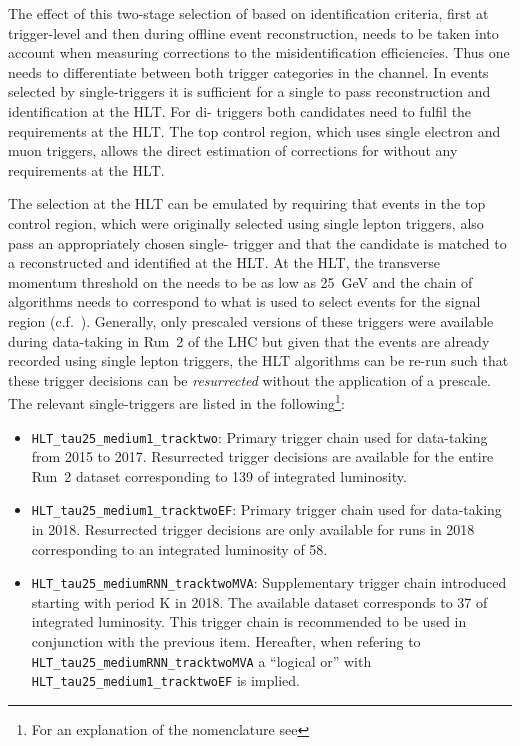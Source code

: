 The effect of this two-stage selection of \tauhadvis based on
identification criteria, first at trigger-level and then during
offline event reconstruction, needs to be taken into account when
measuring corrections to the \tauhadvis misidentification
efficiencies. Thus one needs to differentiate between both trigger
categories in the \hadhad channel. In events selected by
single-\tauhadvis triggers it is sufficient for a single \tauhadvis to
pass reconstruction and identification at the HLT. For di-\tauhadvis
triggers both candidates need to fulfil the requirements at the HLT.
The top control region, which uses single electron and muon triggers,
allows the direct estimation of corrections for \tauhadvis without any
requirements at the HLT.

The selection at the HLT can be emulated by requiring that events in
the top control region, which were originally selected using single
lepton triggers, also pass an appropriately chosen single-\tauhadvis
trigger and that the \tauhadvis candidate is matched to a
reconstructed and identified \tauhadvis at the HLT. At the HLT, the
transverse momentum threshold on the \tauhadvis needs to be as low as
\SI{25}{\GeV} and the chain of algorithms needs to correspond to what
is used to select events for the \hadhad signal region (c.f.\
).  Generally, only prescaled versions of these
triggers were available during data-taking in Run~2 of the LHC but
given that the events are already recorded using single lepton
triggers, the HLT algorithms can be re-run such that these trigger
decisions can be \textit{resurrected} without the application of a
prescale. The relevant single-\tauhadvis triggers are listed in the
following\footnote{For an explanation of the nomenclature see
  }:
\begin{itemize}

\item \verb|HLT_tau25_medium1_tracktwo|: Primary trigger chain used
  for data-taking from 2015 to 2017. Resurrected trigger decisions are
  available for the entire Run~2 dataset corresponding to
  \SI{139}{\ifb} of integrated luminosity.

\item \verb|HLT_tau25_medium1_tracktwoEF|: Primary trigger chain used
  for data-taking in 2018. Resurrected trigger decisions are only
  available for runs in 2018 corresponding to an integrated luminosity
  of \SI{58}{\ifb}.

\item \verb|HLT_tau25_mediumRNN_tracktwoMVA|: Supplementary trigger
  chain introduced starting with period K in 2018. The available
  dataset corresponds to \SI{37}{\ifb} of integrated luminosity.  This
  trigger chain is recommended to be used in conjunction with the
  previous item. Hereafter, when refering to
  \verb|HLT_tau25_mediumRNN_tracktwoMVA| a ``logical or'' with
  \verb|HLT_tau25_medium1_tracktwoEF| is implied.

\end{itemize}

